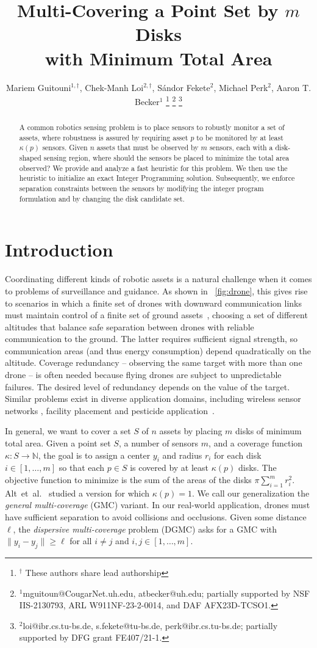\documentclass[letterpaper, 10 pt, conference]{ieeeconf}
\title{\LARGE\bf  Multi-Covering a Point Set by $m$ Disks\\ with Minimum Total Area}
\author{Mariem Guitouni$^{1,\dagger}$,
    Chek-Manh Loi$^{2,\dagger}$,
    Sándor Fekete$^2$,
    Michael Perk$^2$,
    Aaron T. Becker$^1$%
    \thanks{$^\dagger$ These authors share lead authorship}
    \thanks{$^1$mguitoun@CougarNet.uh.edu, atbecker@uh.edu; partially supported by NSF IIS-2130793,  ARL  W911NF-23-2-0014, and DAF AFX23D-TCSO1.
    }
\thanks{$^2$loi@ibr.cs.tu-bs.de, s.fekete@tu-bs.de, perk@ibr.cs.tu-bs.de; partially supported by DFG grant FE407/21-1.}}
\newcommand{\points}{S}
\newcommand{\point}{p}
\begin{document}
\maketitle
\begin{abstract}
    A common robotics sensing problem is to place sensors to robustly monitor a set of assets, where robustness is assured by requiring  asset $p$ to be monitored by at least $\kappa(p)$ sensors.
    Given $n$ assets that must be observed by $m$ sensors, each with a disk-shaped sensing region, where should the sensors be placed to minimize the total area observed?  We provide and analyze a fast heuristic for this problem.
    We then use the heuristic to initialize an exact Integer Programming solution.
    Subsequently, we enforce separation constraints between the sensors by modifying the integer program formulation and by changing the disk candidate set.
\end{abstract}

\section{Introduction}
Coordinating different kinds of robotic assets is a natural challenge when it comes to problems of surveillance and guidance.
As shown in ~\cref{fig:drone}, this gives rise to scenarios
in which a finite set of drones with downward communication links must maintain control of 
a finite set of ground assets~\cite{liu2023robust,Boudjit2015}, choosing a set of different altitudes that 
balance safe separation between drones with reliable communication to the ground.
The latter requires sufficient signal strength, so communication areas (and thus energy consumption) depend quadratically on the altitude.
Coverage redundancy -- observing the same target with more than one drone -- is often needed because flying drones are subject to unpredictable failures.
The desired level of redundancy depends on the value of the target.
Similar problems exist in diverse application domains, including wireless sensor networks \cite{abu2011multi,bar2013note,bernardini2024,10611561,10619030}, facility placement \cite{DBLP:conf/compgeom/AltABEFKLMW06,bhowmick2013constant} and pesticide application~\cite{lal2021time,10160265}.

In general, we want to cover a set $\points$ of $n$ assets by placing $m$ disks of minimum total area.
Given a point set $\points$, a number of sensors $m$, and a coverage function $\kappa: \points \to \mathbb{N}$,
the goal is to assign a center $y_i$ and radius $r_i$ for each disk $i \in [1,\dots,m]$ so that each $\point \in \points$ is covered by at least $\kappa(\point)$ disks.
The objective function to minimize is the sum of the areas of the disks $\pi \sum_{i=1}^{m} r_i^2$.
Alt~et~al.~\cite{DBLP:conf/compgeom/AltABEFKLMW06} studied a version for which $\kappa(\point)=1$.
We call our generalization the \emph{general multi-coverage} (GMC) variant.
In our real-world application, drones must have sufficient separation to avoid collisions and occlusions.
Given some distance $\ell$, the \emph{dispersive multi-coverage} problem (DGMC) asks for a GMC with $\lVert y_i -y_j \rVert \geq \ell$ for all $i\neq j$ and $i,j\in [1,\dots,m]$.
\end{document}
